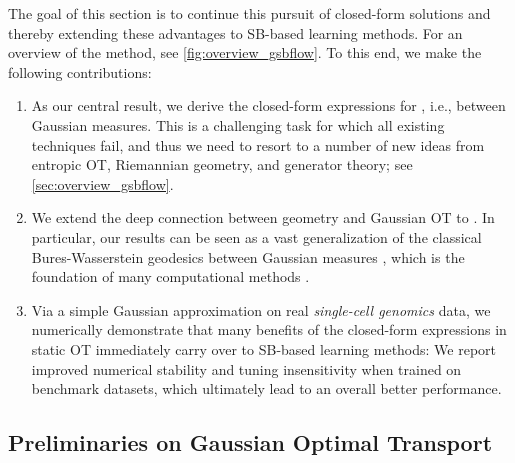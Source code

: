 The goal of this section is to continue this pursuit of closed-form solutions and thereby extending these advantages to \acrshort{SB}-based learning methods. For an overview of the method, see \cref{fig:overview_gsbflow}. To this end, we make the following contributions: \vspace{8pt}
\begin{enumerate}[leftmargin=.4cm,itemsep=.0cm,topsep=.0cm]
\item As our central result, we derive the closed-form expressions for , i.e., between Gaussian measures. This is a challenging task for which all existing techniques fail, and thus we need to resort to a number of new ideas from entropic \acrshort{OT}, Riemannian geometry, and generator theory; see \cref{sec:overview_gsbflow}.

\item We extend the deep connection between geometry and Gaussian \acrshort{OT} to . In particular, our results can be seen as a vast generalization of the classical Bures-Wasserstein geodesics between Gaussian measures \citep{takatsu2010wasserstein, bhatia2019bures}, which is the foundation of many computational methods \citep{chewi2020gradient, altschuler2021averaging, han2021riemannian}.

\item Via a simple Gaussian approximation on real \emph{single-cell genomics} data, we numerically demonstrate that many benefits of the closed-form expressions in static \acrshort{OT} immediately carry over to \acrshort{SB}-based learning methods: We report improved numerical stability and tuning insensitivity when trained on benchmark datasets, which ultimately lead to an overall better performance.

\end{enumerate}


\subsection{Preliminaries on Gaussian Optimal Transport}
\label{sec:prelim_gsbflow}

